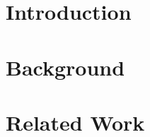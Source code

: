 \documentclass[letterpaper,12pt,titlepage,oneside,final]{book}
\begin{document}


\chapter{Introduction}



\chapter{Background}



\chapter{Related Work}
\end{document}
